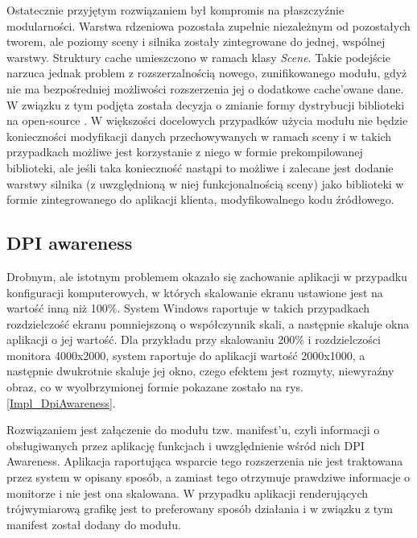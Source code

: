 Ostatecznie przyjętym rozwiązaniem był kompromis na płaszczyźnie modularności. Warstwa rdzeniowa pozostała zupełnie niezależnym od pozostałych tworem, ale poziomy sceny i silnika zostały zintegrowane do jednej, wspólnej warstwy. Struktury cache umieszczono w ramach klasy \textit{Scene}. Takie podejście narzuca jednak problem z rozszerzalnością nowego, zunifikowanego modułu, gdyż nie ma bezpośredniej możliwości rozszerzenia jej o dodatkowe cache'owane dane. W związku z tym podjęta została decyzja o zmianie formy dystrybucji biblioteki na open-source \cite{GitHub:Minik:MasterThesisUniversalRenderingModuleD3D11}. W większości docelowych przypadków użycia modułu nie będzie konieczności modyfikacji danych przechowywanych w ramach sceny i w takich przypadkach możliwe jest korzystanie z niego w formie prekompilowanej biblioteki, ale jeśli taka konieczność nastąpi to możliwe i zalecane jest dodanie warstwy silnika (z uwzględnioną w niej funkcjonalnością sceny) jako biblioteki w formie zintegrowanego do aplikacji klienta, modyfikowalnego kodu źródłowego. 

\subsection{DPI awareness}
Drobnym, ale istotnym problemem okazało się zachowanie aplikacji w przypadku konfiguracji komputerowych, w których skalowanie ekranu ustawione jest na wartość inną niż 100\%. System Windows raportuje w takich przypadkach rozdzielczość ekranu pomniejszoną o współczynnik skali, a następnie skaluje okna aplikacji o jej wartość. Dla przykładu przy skalowaniu 200\% i rozdzielczości monitora 4000x2000, system raportuje do aplikacji wartość 2000x1000, a następnie dwukrotnie skaluje jej okno, czego efektem jest rozmyty, niewyraźny obraz, co w wyolbrzymionej formie pokazane zostało na rys. \ref{Impl_DpiAwareness}.

Rozwiązaniem jest załączenie do modułu tzw. manifest'u, czyli informacji o obsługiwanych przez aplikację funkcjach i uwzględnienie wśród nich DPI Awareness. Aplikacja raportująca wsparcie tego rozszerzenia nie jest traktowana przez system w opisany sposób, a zamiast tego otrzymuje prawdziwe informacje o monitorze i nie jest ona skalowana. W przypadku aplikacji renderujących trójwymiarową grafikę jest to preferowany sposób działania i w związku z tym manifest został dodany do modułu. 

